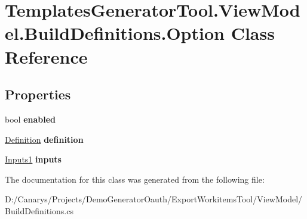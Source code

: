 \hypertarget{class_templates_generator_tool_1_1_view_model_1_1_build_definitions_1_1_option}{}\section{Templates\+Generator\+Tool.\+View\+Model.\+Build\+Definitions.\+Option Class Reference}
\label{class_templates_generator_tool_1_1_view_model_1_1_build_definitions_1_1_option}
\subsection*{Properties}
\begin{DoxyCompactItemize}
\item 
\mbox{\label{class_templates_generator_tool_1_1_view_model_1_1_build_definitions_1_1_option_a1a4ecfbed6916154f95fa591a5de0c47}} 
bool {\bfseries enabled}
\item 
\mbox{\label{class_templates_generator_tool_1_1_view_model_1_1_build_definitions_1_1_option_a9fe15448f2401d868aadbbb28bc69204}} 
\mbox{\hyperlink{class_templates_generator_tool_1_1_view_model_1_1_build_definitions_1_1_definition}{Definition}} {\bfseries definition}
\item 
\mbox{\label{class_templates_generator_tool_1_1_view_model_1_1_build_definitions_1_1_option_ace2c7a13bda1ef9f7ee4a5a170083f59}} 
\mbox{\hyperlink{class_templates_generator_tool_1_1_view_model_1_1_build_definitions_1_1_inputs1}{Inputs1}} {\bfseries inputs}
\end{DoxyCompactItemize}


The documentation for this class was generated from the following file\+:\begin{DoxyCompactItemize}
\item 
D\+:/\+Canarys/\+Projects/\+Demo\+Generator\+Oauth/\+Export\+Workitems\+Tool/\+View\+Model/Build\+Definitions.\+cs\end{DoxyCompactItemize}
